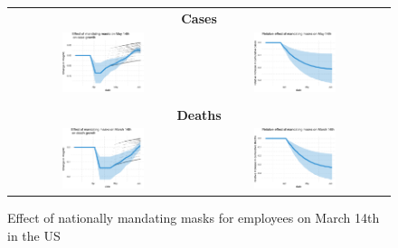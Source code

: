 \documentclass[11pt,reqno,letter]{amsart}
\theoremstyle{definition}
\begin{document}
\begin{figure}[ht]
  \caption{Effect of nationally mandating masks for employees on March
    14th in the US\label{fig:US-mask}}
  \begin{minipage}{\linewidth}
    \centering
    \medskip
    \begin{tabular}{cc}
      \multicolumn{2}{c}{\textbf{Cases}} \\
      \includegraphics[width=0.45\textwidth]{tables_and_figures/us-mask-dgrowth_idx}
      &
        \includegraphics[width=0.45\textwidth]{tables_and_figures/us-mask-rcumu_idx}
      \\
      \\
      \multicolumn{2}{c}{\textbf{Deaths}} \\
      \includegraphics[width=0.45\textwidth]{tables_and_figures/us-mask-dgrowth_deaths_idx}
      &
        \includegraphics[width=0.45\textwidth]{tables_and_figures/us-mask-rcumu_deaths_idx}
    \end{tabular}


\end{minipage}
\end{figure}
\end{document}
